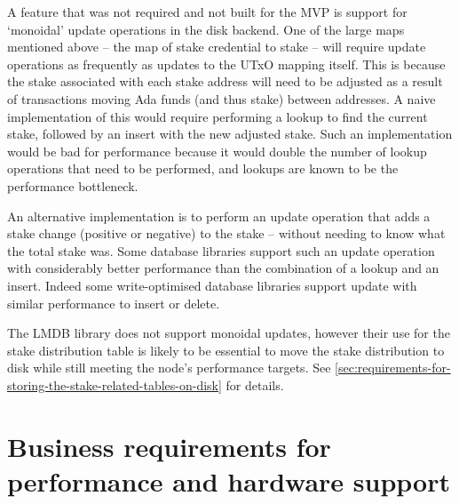 \documentclass[11pt,a4paper]{article}
\begin{document}
A feature that was not required and not built for the MVP is support for
`monoidal' update operations in the disk backend. One of the large maps
mentioned above -- the map of stake credential to stake -- will require update
operations as frequently as updates to the UTxO mapping itself. This is because
the stake associated with each stake address will need to be adjusted as a
result of transactions moving Ada funds (and thus stake) between addresses. A
naive implementation of this would require performing a lookup to find the
current stake, followed by an insert with the new adjusted stake. Such an
implementation would be bad for performance because it would double the number
of lookup operations that need to be performed, and lookups are known to be the
performance bottleneck.

An alternative implementation is to perform an update operation that adds a
stake change (positive or negative) to the stake -- without needing to know
what the total stake was. Some database libraries support such an update
operation with considerably better performance than the combination of a lookup
and an insert. Indeed some write-optimised database libraries support update
with similar performance to insert or delete.

The LMDB library does not support monoidal updates, however their use for the
stake distribution table is likely to be essential to move the stake
distribution to disk while still meeting the node's performance targets. See
\cref{sec:requirements-for-storing-the-stake-related-tables-on-disk} for
details.


\section{Business requirements for performance and hardware support}
\label{sec:business-requirements}
\end{document}
